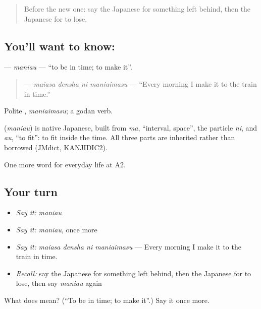 \label{lesson:JA-C153-maniau}



\begin{quote}
Before the new one: say the Japanese for something left behind, then the Japanese for to lose.
\end{quote}

\subsection*{You'll want to know: }
\textbf{} — \emph{maniau} — \textquotedblleft{}to be in time; to make it\textquotedblright{}.

\begin{quote}
\textbf{  } — \emph{maiasa densha ni maniaimasu} — \textquotedblleft{}Every morning I make it to the train in time.\textquotedblright{}
\end{quote}

Polite \textbf{}, \emph{maniaimasu}; a godan verb.

\begin{cousinweb}
\textbf{} (\emph{maniau}) is native Japanese, built from \emph{ma}, \textquotedblleft{}interval, space\textquotedblright{}, the particle \emph{ni}, and \emph{au}, \textquotedblleft{}to fit\textquotedblright{}: to fit inside the time. All three parts are inherited rather than borrowed (JMdict, KANJIDIC2).
\end{cousinweb}

\begin{grammarlens}[title={What you've built}]
One more word for everyday life at A2.
\end{grammarlens}

\subsection*{Your turn}
\begin{itemize}
\raggedright
  \item \emph{Say it:} \emph{maniau}
  \item \emph{Say it:} \emph{maniau}, once more
  \item \emph{Say it:} \emph{maiasa densha ni maniaimasu} — Every morning I make it to the train in time.
  \item \emph{Recall:} say the Japanese for something left behind, then the Japanese for to lose, then say \emph{maniau} again
\end{itemize}

\begin{tcolorbox}[breakable,colback=teal!4,colframe=teal!35!black,title={Before you move on}]
What does  mean? (\textquotedblleft{}To be in time; to make it\textquotedblright{}.) Say it once more.
\end{tcolorbox}
